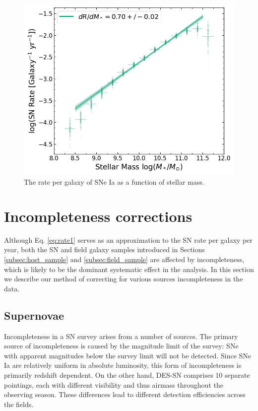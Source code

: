\documentclass[fleqn,usenatbib]{mnras}
\begin{document}
\begin{figure}
    \centering
    \includegraphics[width=.5\textwidth]{figs/rate_vs_mass_all.png}
    \caption{The rate per galaxy of SNe Ia as a function of stellar mass.}%
    \label{fig:rate_raw}
\end{figure}
\section{Incompleteness corrections}
\label{sec:incompleteness}
Although Eq. \ref{eq:rate1} serves as an approximation to the SN rate per galaxy per year, both the SN and field galaxy samples introduced in Sections \ref{subsec:host_sample} and \ref{subsec:field_sample} are affected by incompleteness, which is likely to be the dominant systematic effect in the analysis. In this section we describe our method of correcting for various sources incompleteness in the data.

\subsection{Supernovae \label{subsec:incompleteness_SNe}}

Incompleteness in a SN survey arises from a number of sources. The primary source of incompleteness is caused by the magnitude limit of the survey: SNe with apparent magnitudes below the survey limit will not be detected. Since SNe Ia are relatively uniform in absolute luminosity, this form of incompleteness is primarily redshift dependent. On the other hand, DES-SN comprises 10 separate pointings, each with different visibility and thus airmass throughout the observing season. These differences lead to different detection efficiencies across the fields.
\end{document}
